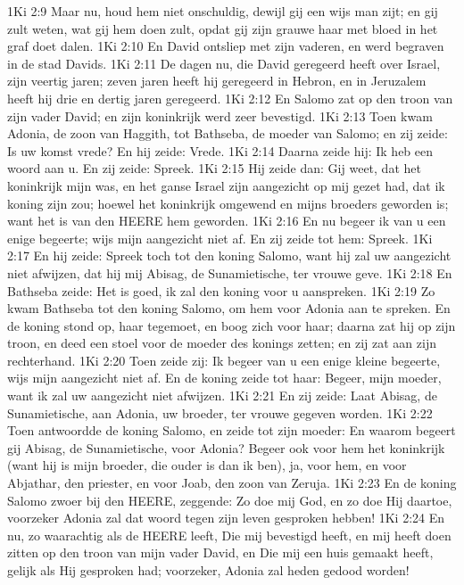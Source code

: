 1Ki 2:9  Maar nu, houd hem niet onschuldig, dewijl gij een wijs man zijt; en gij zult weten, wat gij hem doen zult, opdat gij zijn grauwe haar met bloed in het graf doet dalen.
1Ki 2:10  En David ontsliep met zijn vaderen, en werd begraven in de stad Davids.
1Ki 2:11  De dagen nu, die David geregeerd heeft over Israel, zijn veertig jaren; zeven jaren heeft hij geregeerd in Hebron, en in Jeruzalem heeft hij drie en dertig jaren geregeerd.
1Ki 2:12  En Salomo zat op den troon van zijn vader David; en zijn koninkrijk werd zeer bevestigd.
1Ki 2:13  Toen kwam Adonia, de zoon van Haggith, tot Bathseba, de moeder van Salomo; en zij zeide: Is uw komst vrede? En hij zeide: Vrede.
1Ki 2:14  Daarna zeide hij: Ik heb een woord aan u. En zij zeide: Spreek.
1Ki 2:15  Hij zeide dan: Gij weet, dat het koninkrijk mijn was, en het ganse Israel zijn aangezicht op mij gezet had, dat ik koning zijn zou; hoewel het koninkrijk omgewend en mijns broeders geworden is; want het is van den HEERE hem geworden.
1Ki 2:16  En nu begeer ik van u een enige begeerte; wijs mijn aangezicht niet af. En zij zeide tot hem: Spreek.
1Ki 2:17  En hij zeide: Spreek toch tot den koning Salomo, want hij zal uw aangezicht niet afwijzen, dat hij mij Abisag, de Sunamietische, ter vrouwe geve.
1Ki 2:18  En Bathseba zeide: Het is goed, ik zal den koning voor u aanspreken.
1Ki 2:19  Zo kwam Bathseba tot den koning Salomo, om hem voor Adonia aan te spreken. En de koning stond op, haar tegemoet, en boog zich voor haar; daarna zat hij op zijn troon, en deed een stoel voor de moeder des konings zetten; en zij zat aan zijn rechterhand.
1Ki 2:20  Toen zeide zij: Ik begeer van u een enige kleine begeerte, wijs mijn aangezicht niet af. En de koning zeide tot haar: Begeer, mijn moeder, want ik zal uw aangezicht niet afwijzen.
1Ki 2:21  En zij zeide: Laat Abisag, de Sunamietische, aan Adonia, uw broeder, ter vrouwe gegeven worden.
1Ki 2:22  Toen antwoordde de koning Salomo, en zeide tot zijn moeder: En waarom begeert gij Abisag, de Sunamietische, voor Adonia? Begeer ook voor hem het koninkrijk (want hij is mijn broeder, die ouder is dan ik ben), ja, voor hem, en voor Abjathar, den priester, en voor Joab, den zoon van Zeruja.
1Ki 2:23  En de koning Salomo zwoer bij den HEERE, zeggende: Zo doe mij God, en zo doe Hij daartoe, voorzeker Adonia zal dat woord tegen zijn leven gesproken hebben!
1Ki 2:24  En nu, zo waarachtig als de HEERE leeft, Die mij bevestigd heeft, en mij heeft doen zitten op den troon van mijn vader David, en Die mij een huis gemaakt heeft, gelijk als Hij gesproken had; voorzeker, Adonia zal heden gedood worden!
